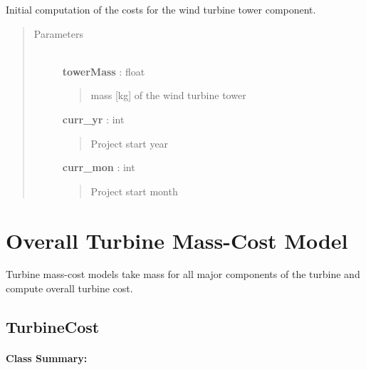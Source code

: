 \documentclass[letterpaper,10pt,openany,oneside]{sphinxmanual}
\begin{document}
\begin{fulllineitems}
\label{documentation:turbine_costSE.src.tower_costSE.TowerCost}
Initial computation of the costs for the wind turbine tower component.
\begin{quote}\begin{description}
\item[{Parameters }] \leavevmode\\
\textbf{towerMass} : float
\begin{quote}

mass {[}kg{]} of the wind turbine tower
\end{quote}

\textbf{curr\_yr} : int
\begin{quote}

Project start year
\end{quote}

\textbf{curr\_mon} : int
\begin{quote}

Project start month
\end{quote}

\end{description}\end{quote}

\end{fulllineitems}



\section{Overall Turbine Mass-Cost Model}
\label{documentation:overall-turbine-mass-cost-model}
Turbine mass-cost models take mass for all major components of the turbine and compute overall turbine cost.


\subsection{TurbineCost}
\label{documentation:turbinecost}\label{documentation:turbinecost-class-label}\paragraph{Class Summary:}
\end{document}
